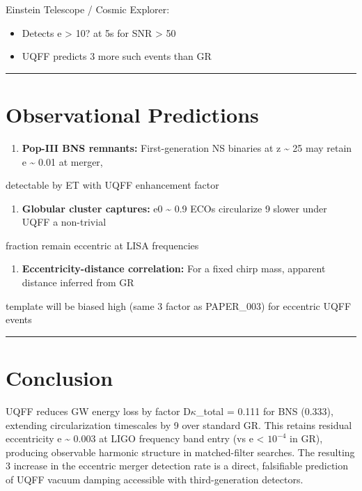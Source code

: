 \documentclass[12pt,a4paper]{article}
\begin{document}
Einstein Telescope / Cosmic Explorer:

\begin{itemize}
  \item Detects e > 10? at 5s for SNR > 50
  \item UQFF predicts 3 more such events than GR
\end{itemize}

\medskip\hrule\medskip

\section{Observational Predictions}

\begin{enumerate}
  \item \textbf{Pop-III BNS remnants:} First-generation NS binaries at z \textasciitilde{} 25 may retain e \textasciitilde{} 0.01 at merger,
\end{enumerate}

detectable by ET with UQFF enhancement factor

\begin{enumerate}
  \item \textbf{Globular cluster captures:} e0 \textasciitilde{} 0.9 ECOs circularize 9 slower under UQFF  a non-trivial
\end{enumerate}

fraction remain eccentric at LISA frequencies

\begin{enumerate}
  \item \textbf{Eccentricity-distance correlation:} For a fixed chirp mass, apparent distance inferred from GR
\end{enumerate}

template will be biased high (same 3 factor as PAPER\_003) for eccentric UQFF events

\medskip\hrule\medskip

\section{Conclusion}

UQFF reduces GW energy loss by factor D$\kappa$\_total = 0.111 for BNS (0.333), extending circularization timescales by 9 over standard GR. This retains residual eccentricity e \textasciitilde{} 0.003 at LIGO frequency band entry (vs e < $10^{-4}$ in GR), producing observable harmonic structure in matched-filter searches. The resulting 3 increase in the eccentric merger detection rate is a direct, falsifiable prediction of UQFF vacuum damping accessible with third-generation detectors.
\end{document}
